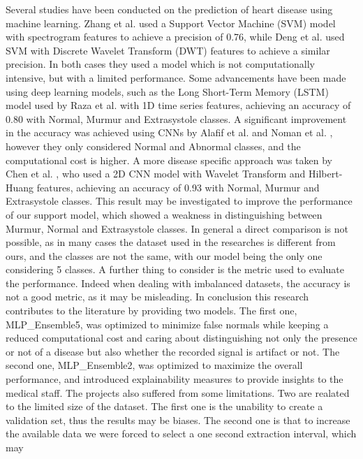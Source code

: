Several studies have been conducted on the prediction of heart disease using machine learning. 
Zhang et al. \cite{Zhang_Han_Deng_2017} used a Support Vector Machine (SVM) model with spectrogram features to achieve a precision of 0.76,
while Deng et al. \cite{Deng_Han_2016} used SVM with Discrete Wavelet Transform (DWT) features to achieve a similar precision. In both
cases they used a model which is not computationally intensive, but with a limited performance.
Some advancements have been made using deep learning models, such as the Long Short-Term Memory (LSTM) model used by Raza et al. \cite{Raza_Mehmood_Ullah_Ahmad_Choi_On_2019}
with 1D time series features, achieving an accuracy of 0.80 with Normal, Murmur and Extrasystole classes.
A significant improvement in the accuracy was achieved using CNNs by Alafif et al. \cite{Alafif_Boulares_Barnawi_Alafif_Althobaiti_Alferaidi_2020} and Noman et al. \cite{Noman_Ting_Salleh_Ombao_2019},
however they only considered Normal and Abnormal classes, and the computational cost is higher. 
A more disease specific approach was taken by Chen et al. \cite{Chen_Ren_Hao_Hu_2018}, who used a 2D CNN model with Wavelet Transform and Hilbert-Huang features, achieving an accuracy of 0.93 with Normal, Murmur and Extrasystole classes.
This result may be investigated to improve the performance of our support model, which showed 
a weakness in distinguishing between Murmur, Normal and Extrasystole classes. 
In general a direct comparison is not possible, as in many cases the dataset used in the researches is different from ours, and the classes are not the same, with 
our model being the only one considering 5 classes.
A further thing to consider is the metric used to evaluate the performance. Indeed when dealing 
with imbalanced datasets, the accuracy is not a good metric, as it may be misleading.
In conclusion this research contributes to the literature by providing 
two models. The first one, MLP\_Ensemble5, was optimized to minimize false normals while keeping
a reduced computational cost and caring about distinguishing not only the presence or not of a disease but also
whether the recorded signal is artifact or not. The second one, MLP\_Ensemble2, was optimized to maximize the overall performance,
and introduced explainability measures to provide insights to the medical staff.
The projects also suffered from some limitations. Two are realated to the limited size of the dataset. 
The first one is the unability to create a validation set, thus the results may be biases. The second 
one is that to increase the available data we were forced to select a one second extraction interval, which may
